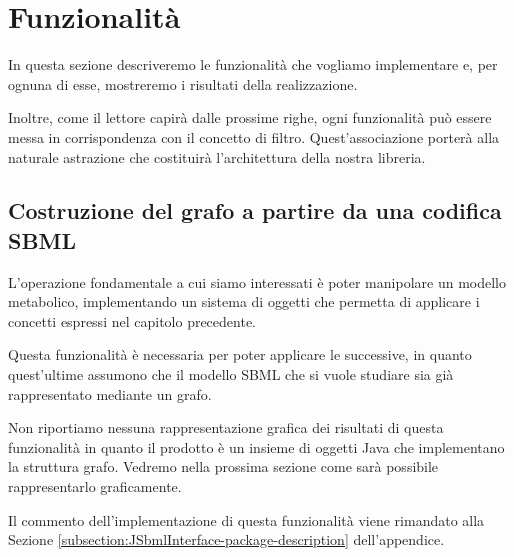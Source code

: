 \section{Funzionalit\`a}
\label{section:use-cases}

In questa sezione descriveremo le funzionalit\`a che vogliamo
implementare e, per ognuna di esse, mostreremo i risultati della
realizzazione.

Inoltre, come il lettore capir\`a dalle prossime righe, ogni
funzionalit\`a pu\`o essere messa in corrispondenza con il concetto di
filtro. Quest'associazione porter\`a alla naturale astrazione che
costituir\`a l'architettura della nostra libreria.

\subsection{Costruzione del grafo a partire da una codifica SBML}
L'operazione fondamentale a cui siamo interessati \`e poter manipolare
un modello metabolico, implementando un sistema di oggetti che
permetta di applicare i concetti espressi nel capitolo precedente.

Questa funzionalit\`a \`e necessaria per poter applicare le
successive, in quanto quest'ultime assumono che il modello SBML che si
vuole studiare sia gi\`a rappresentato mediante un grafo.

Non riportiamo nessuna rappresentazione grafica dei risultati di
questa funzionalit\`a in quanto il prodotto \`e un insieme di oggetti
Java che implementano la struttura grafo. Vedremo nella prossima
sezione come sar\`a possibile rappresentarlo graficamente.

Il commento dell'implementazione di questa funzionalit\`a viene
rimandato alla Sezione
\ref{subsection:JSbmlInterface-package-description} dell'appendice.


